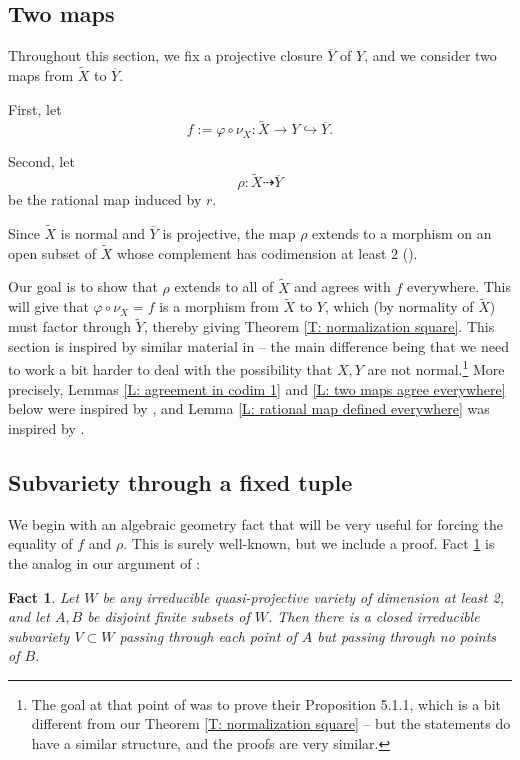 \documentclass{amsart}
\newtheorem{fact}[theorem]{Fact}
\theoremstyle{definition}
\begin{document}
\subsection{Two maps}

Throughout this section, we fix a projective closure $\overline{Y}$ of $Y$, and we consider two maps from $\widetilde{X}$ to $\overline{Y}$.

First, let
\[
f:= \varphi \circ \nu_X : \widetilde{X} \to Y \hookrightarrow \overline{Y}.
\]

Second, let
\[
\rho : \widetilde{X} \dashrightarrow \overline{Y}
\]
be the rational map induced by $r$.

Since $\widetilde{X}$ is normal and $\overline{Y}$ is projective, the map $\rho$ extends to a morphism on an open subset of $\widetilde{X}$ whose complement has codimension at least $2$ (\cite[Proposition II.6.1]{Hartshorne}).

Our goal is to show that $\rho$ extends to all of $\widetilde X$ and agrees with $f$ everywhere. This will give that $\varphi\circ\nu_
X=f$ is a morphism from $\widetilde X$ to $Y$, which (by normality of $\widetilde X$) must factor through $\tilde Y$, thereby giving Theorem \ref{T: normalization square}. This section is inspired by similar material in \cite[Section 5.1]{KLOS} -- the main difference being that we need to work a bit harder to deal with the possibility that $X,Y$ are not normal.\footnote{The goal at that point of \cite{KLOS} was to prove their Proposition 5.1.1, which is a bit different from our Theorem \ref{T: normalization square} -- but the statements do have a similar structure, and the proofs are very similar.} More precisely, Lemmas \ref{L: agreement in codim 1} and \ref{L: two maps agree everywhere} below were inspired by \cite[Lemma 5.1.3]{KLOS}, and Lemma \ref{L: rational map defined everywhere} was inspired by \cite[Lemma 5.1.4]{KLOS}.

\subsection{Subvariety through a fixed tuple} We begin with an algebraic geometry fact that will be very useful for forcing the equality of $f$ and $\rho$. This is surely well-known, but we include a proof. Fact \ref{F: curve through tuple} is the analog in our argument of \cite[Lemma 5.1.2]{KLOS}:

\begin{fact}\label{F: curve through tuple} Let $W$ be any irreducible quasi-projective variety of dimension at least 2, and let $A,B$ be disjoint finite subsets of $W$. Then there is a closed irreducible subvariety $V\subset W$ passing through each point of $A$ but passing through no points of $B$.
\end{fact}
\end{document}
